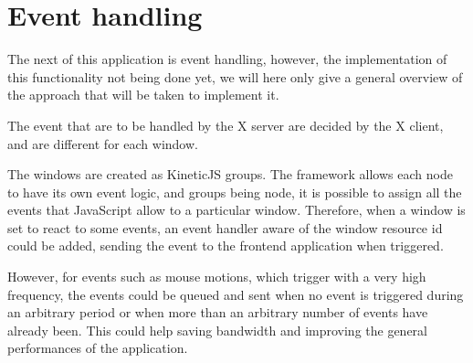 \section{Event handling}
%
The next of this application is event handling, however, the implementation of this 
functionality not being done yet, we will here only give a general overview of the 
approach that will be taken to implement it.

The event that are to be handled by the X server are decided by the X client, 
and are different for each window.

The windows are created as KineticJS groups. The framework allows each node to have 
its own event logic, and groups being node, it is possible to assign all the 
events that JavaScript allow to a particular window. Therefore, when a window 
is set to react to some events, an event handler aware of the window resource id 
could be added, sending the event to the frontend application when triggered.

However, for events such as mouse motions, which trigger with a very high frequency, 
the events could be queued and sent when no event is triggered during an arbitrary
period or when more than an arbitrary number of events have already been. This could 
help saving bandwidth and improving the general performances of the application.
